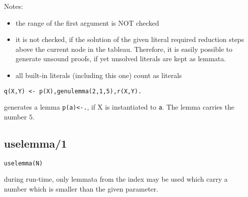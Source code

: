 Notes:
\begin{itemize}
\item
the range of the first argument is NOT checked
\item
it is not checked, if the solution of the given literal required
reduction steps above the current node in the tableau.
Therefore, it is easily possible to generate unsound proofs, if
yet unsolved literals are kept as lemmata.
\item
all built-in literals (including this one) count as literals
\end{itemize}



\begin{verbatim}
q(X,Y) <- p(X),genulemma(2,1,5),r(X,Y).
\end{verbatim}

generates a lemma {\tt p(a)<-.}, if X is instantiated to {\tt a}.
The lemma carries the number $5$.


\subsection{uselemma/1}

{\tt uselemma(N)}


during run-time, only lemmata from the index may be used which carry
a number which is smaller than the given parameter.


